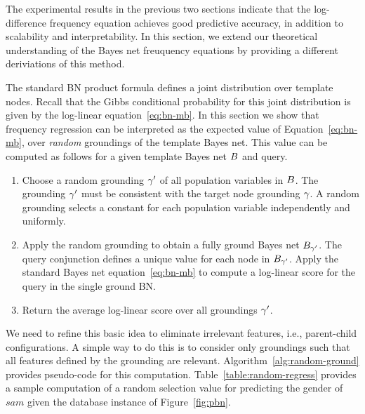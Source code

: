 \documentclass[twoside,11pt]{article}
\begin{document}
The experimental results in the previous two sections indicate that the log-difference frequency equation achieves good predictive accuracy, in addition to scalability and interpretability. In this section, we extend our theoretical understanding of the Bayes net freuquency equations by providing a different deriviations of this method. 

The standard BN product formula defines a joint distribution over template nodes. Recall that the Gibbs conditional probability for this joint distribution is given by the log-linear equation~\ref{eq:bn-mb}. 
In this section we show that frequency regression can be interpreted as the expected value of Equation~\ref{eq:bn-mb}, over {\em random} groundings of the template Bayes net. This value can be computed as follows for a given template Bayes net $B$ and query.

\begin{enumerate}
\item Choose a random grounding $\gamma'$ of all population variables in $B$. The grounding $\gamma'$ must be consistent with the target node grounding $\gamma$. A random grounding selects a constant for each population variable independently and uniformly.
\item Apply the random grounding to obtain a fully ground Bayes net $B_{\gamma'}$. The query conjunction defines a unique value for each node in $B_{\gamma'}$. Apply the standard Bayes net equation~\ref{eq:bn-mb} to compute a log-linear score for the query in the single ground BN.
\item Return the average log-linear score over all groundings $\gamma'$.
\end{enumerate}

We need to refine this basic idea to eliminate irrelevant features, i.e., parent-child configurations. A simple way to do this is to consider only groundings such that all features defined by the grounding are relevant.
Algorithm~\ref{alg:random-ground} provides pseudo-code for this computation. Table~\ref{table:random-regress} provides a sample computation of a random selection value for predicting the gender of $sam$ given the database instance of Figure~\ref{fig:pbn}.
\end{document}

